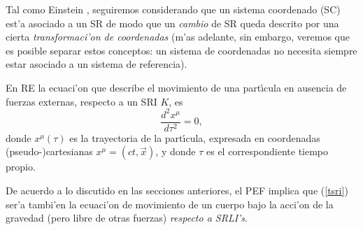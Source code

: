 Tal como Einstein \cite{Einstein56}, seguiremos considerando que un sistema coordenado (SC) est'a asociado a un SR de modo que un \textit{cambio} de SR queda descrito por una cierta \textit{transformaci'on de  coordenadas} (m'as adelante, sin embargo, veremos que es posible separar estos conceptos: un sistema de coordenadas no necesita siempre estar asociado a un sistema de referencia).

En RE la ecuaci'on que describe el movimiento de una part{\'\i}cula
en ausencia de fuerzas externas, respecto a un SRI $K$, es
\begin{equation}
\frac{d^2x^\mu}{d\tau ^2}=0, \label{tsri}
\end{equation}
donde $x^\mu(\tau )$ es la trayectoria de la part{\'\i}cula,
expresada en coordenadas (pseudo-)cartesianas $x^\mu=(ct,\vec{x})$, y donde $\tau $ es el correspondiente tiempo propio.

De acuerdo a lo discutido en las secciones anteriores, el PEF implica que (\ref{tsri}) ser'a tambi'en la ecuaci'on de movimiento de un cuerpo bajo la acci'on de la gravedad (pero libre de otras fuerzas) \textit{respecto a SRLI's}.

